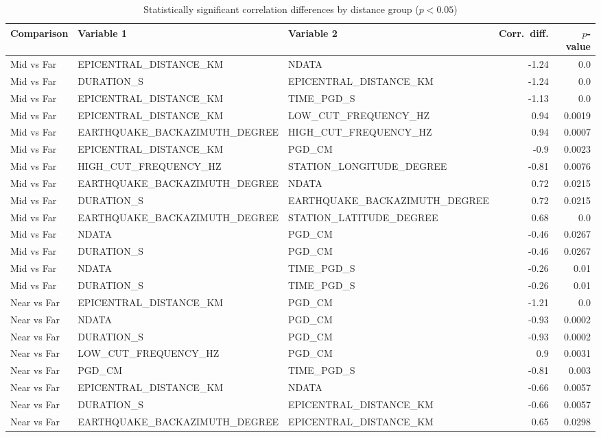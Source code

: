\begin{table}[H]
\centering
\caption{Statistically significant correlation differences by distance group ($p < 0.05$)}
\label{tab:corr_diff}
\begin{tabular}{lllrr}
\toprule
Comparison & Variable 1 & Variable 2 & Corr.\ diff. & $p$-value \\
\midrule
Mid vs Far & EPICENTRAL_DISTANCE_KM & NDATA & -1.24 & 0.0 \\
Mid vs Far & DURATION_S & EPICENTRAL_DISTANCE_KM & -1.24 & 0.0 \\
Mid vs Far & EPICENTRAL_DISTANCE_KM & TIME_PGD_S & -1.13 & 0.0 \\
Mid vs Far & EPICENTRAL_DISTANCE_KM & LOW_CUT_FREQUENCY_HZ & 0.94 & 0.0019 \\
Mid vs Far & EARTHQUAKE_BACKAZIMUTH_DEGREE & HIGH_CUT_FREQUENCY_HZ & 0.94 & 0.0007 \\
Mid vs Far & EPICENTRAL_DISTANCE_KM & PGD_CM & -0.9 & 0.0023 \\
Mid vs Far & HIGH_CUT_FREQUENCY_HZ & STATION_LONGITUDE_DEGREE & -0.81 & 0.0076 \\
Mid vs Far & EARTHQUAKE_BACKAZIMUTH_DEGREE & NDATA & 0.72 & 0.0215 \\
Mid vs Far & DURATION_S & EARTHQUAKE_BACKAZIMUTH_DEGREE & 0.72 & 0.0215 \\
Mid vs Far & EARTHQUAKE_BACKAZIMUTH_DEGREE & STATION_LATITUDE_DEGREE & 0.68 & 0.0 \\
Mid vs Far & NDATA & PGD_CM & -0.46 & 0.0267 \\
Mid vs Far & DURATION_S & PGD_CM & -0.46 & 0.0267 \\
Mid vs Far & NDATA & TIME_PGD_S & -0.26 & 0.01 \\
Mid vs Far & DURATION_S & TIME_PGD_S & -0.26 & 0.01 \\
Near vs Far & EPICENTRAL_DISTANCE_KM & PGD_CM & -1.21 & 0.0 \\
Near vs Far & NDATA & PGD_CM & -0.93 & 0.0002 \\
Near vs Far & DURATION_S & PGD_CM & -0.93 & 0.0002 \\
Near vs Far & LOW_CUT_FREQUENCY_HZ & PGD_CM & 0.9 & 0.0031 \\
Near vs Far & PGD_CM & TIME_PGD_S & -0.81 & 0.003 \\
Near vs Far & EPICENTRAL_DISTANCE_KM & NDATA & -0.66 & 0.0057 \\
Near vs Far & DURATION_S & EPICENTRAL_DISTANCE_KM & -0.66 & 0.0057 \\
Near vs Far & EARTHQUAKE_BACKAZIMUTH_DEGREE & EPICENTRAL_DISTANCE_KM & 0.65 & 0.0298 \\

\end{tabular}
\end{table}
